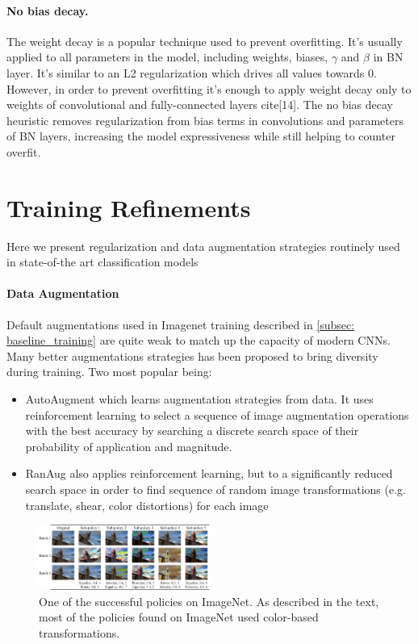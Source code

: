 \paragraph{No bias decay.}
The weight decay is a popular technique used to prevent overfitting. It's usually applied to all parameters in the model, including weights, biases, $\gamma$ and $\beta$ in BN layer. It's similar to an L2 regularization which drives all values towards $0$. However, in order to prevent overfitting it's enough to apply weight decay only to weights of convolutional and fully-connected layers cite[14]. The no bias decay heuristic removes regularization from bias terms in convolutions and parameters of BN layers, increasing the model expressiveness while still helping to counter overfit.  


\section{Training Refinements}

Here we present regularization and data augmentation strategies routinely used in state-of-the art classification models \cite{lin2020neural_genet} \cite{tan2019_efficientnet} \cite{tan2021_efficientnetv2}

\paragraph{Data Augmentation}
Default augmentations used in Imagenet training described in \ref{subsec: baseline_training} are quite weak to match up the capacity of modern CNNs. Many better augmentations strategies has been proposed to bring diversity during training. Two most popular being: 

\begin{itemize}
    \item AutoAugment \cite{cubuk2018_autoaugment} which learns augmentation strategies from data. It uses reinforcement learning to select a sequence of image augmentation operations with the best accuracy by searching a discrete search space of their probability of application and magnitude.
    \item RanAug \cite{cubuk2020_randaugment} also applies reinforcement learning, but to a significantly reduced search space in order to find sequence of random image transformations (e.g. translate, shear, color distortions) for each image
\end{itemize}

\begin{figure}[h!]
    \caption{One of the successful policies on ImageNet. As described in the text, most of the policies found on ImageNet used color-based transformations.}
    \label{fig: randaug}
    \includegraphics[width=0.5\textwidth]{images/randaug_policy.png}
  \end{figure}

